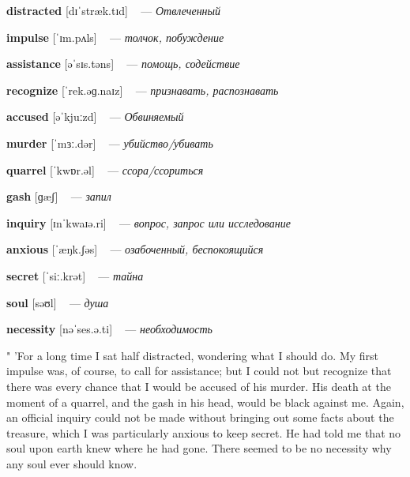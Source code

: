 \documentclass[a4paper,oneside,12pt]{amsart}
\begin{document}
{\large 

 {\bf distracted } [dɪˈstræk.tɪd] ~ --- \emph{ Отвлеченный }

{\bf impulse } [ˈɪm.pʌls] ~ --- \emph{ толчок, побуждение }

{\bf assistance } [əˈsɪs.təns] ~ --- \emph{ помощь, содействие }

{\bf recognize } [ˈrek.əɡ.naɪz] ~ --- \emph{ признавать, распознавать }

{\bf accused } [əˈkjuːzd] ~ --- \emph{ Обвиняемый }

{\bf murder } [ˈmɜː.dər] ~ --- \emph{ убийство/убивать }

{\bf quarrel } [ˈkwɒr.əl] ~ --- \emph{ ссора/ссориться }

{\bf gash } [ɡæʃ] ~ --- \emph{ запил }

{\bf inquiry } [ɪnˈkwaɪə.ri] ~ --- \emph{ вопрос, запрос или исследование }

{\bf anxious } [ˈæŋk.ʃəs] ~ --- \emph{ озабоченный, беспокоящийся }

{\bf secret } [ˈsiː.krət] ~ --- \emph{ тайна }

{\bf soul } [səʊl] ~ --- \emph{ душа }

{\bf necessity } [nəˈses.ə.ti] ~ --- \emph{ необходимость }

} \vspace{6mm} {\Large 

 
" 'For a long time I sat half distracted, wondering what I should do. My first impulse was, of course, to call for assistance; but I could not but recognize that there was every chance that I would be accused of his murder. His death at the moment of a quarrel, and the gash in his head, would be black against me. Again, an official inquiry could not be made without bringing out some facts about the treasure, which I was particularly anxious to keep secret. He had told me that no soul upon earth knew where he had gone. There seemed to be no necessity why any soul ever should know.
\\ } 
\end{document}
